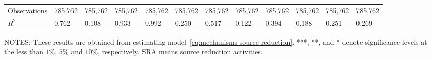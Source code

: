 \begin{table}[H]
{\begin{tabular}{@{}llllllllllll@{}}
            Observations                & 785,762  & 785,762         & 785,762    & 785,762               & 785,762  & 785,762   & 785,762              & 785,762               & 785,762 & 785,762 & 785,762         \\
            $R^2$                       & 0.762    & 0.108           & 0.933      & 0.992                 & 0.250    & 0.517     & 0.122                & 0.394                 & 0.188                     & 0.251                       & 0.269                       \\ \bottomrule\bottomrule
        \end{tabular}%
    }
    \begin{minipage}{\columnwidth}
        \vspace{0.05in}
        \tiny NOTES: These results are obtained from estimating model~\ref{eq:mechanisms-source-reduction}. ***, **, and * denote significance levels at the less than $1\%$, $5\%$ and $10\%$, respectively. SRA means source reduction activities.
    \end{minipage}
\end{table}